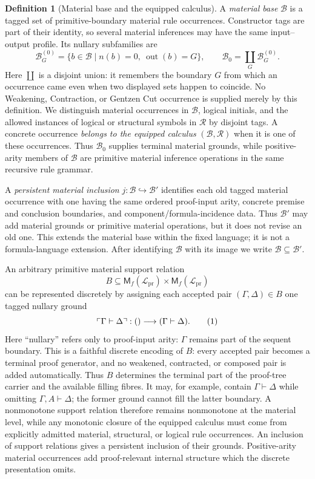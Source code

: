 \documentclass[10pt,a4paper]{article}
\theoremstyle{plain}
\theoremstyle{definition}
\newtheorem{definition}[theorem]{Definition}
\theoremstyle{remark}
\newcommand{\Base}{\mathcal B}
\newcommand{\Rules}{\mathcal R}
\newcommand{\Lang}{\mathcal L}
\newcommand{\ms}{\mathrel{\vdash}}
\newcommand{\eqtag}{\refstepcounter{equation}\tag{\theequation}}
\begin{document}
\begin{definition}[Material base and the equipped calculus]
\label{def:material-equipped}
A \emph{material base} \(\Base\) is a tagged set of primitive-boundary
material rule occurrences.  Constructor tags are part of their identity, so several
material inferences may have the same input--output profile.  Its nullary
subfamilies are
\[
 \Base^{(0)}_G
   =\{b\in\Base\mid n(b)=0,\ \operatorname{out}(b)=G\},
 \qquad
 \Base_0=\coprod_G\Base^{(0)}_G .
\]
Here \(\coprod\) is a disjoint union: it remembers the boundary \(G\) from
which an occurrence came even when two displayed sets happen to coincide.
No Weakening, Contraction, or Gentzen Cut occurrence is supplied merely by
this definition.  We distinguish material occurrences in \(\Base\),
logical initials, and the allowed instances of logical or structural
symbols in \(\Rules\) by disjoint tags.  A concrete occurrence
\emph{belongs to the equipped calculus} \((\Base,\Rules)\) when it is one
of these occurrences.  Thus
\(\Base_0\) supplies terminal material grounds, while positive-arity
members of \(\Base\) are primitive material inference operations in the
same recursive rule grammar.

A \emph{persistent material inclusion}
\(j:\Base\hookrightarrow\Base'\) identifies each old tagged material
occurrence with one having the same ordered proof-input arity, concrete
premise and conclusion boundaries, and component/formula-incidence data.
Thus \(\Base'\) may add material grounds or primitive material operations,
but it does not revise an old one.  This extends the material base within
the fixed language; it is not a formula-language extension.  After
identifying \(\Base\) with its image we write
\(\Base\subseteq\Base'\).
\end{definition}

An arbitrary primitive material support relation
\[
 B\subseteq\mathsf M_f(\Lang_{\mathrm{pr}})
          \times\mathsf M_f(\Lang_{\mathrm{pr}})
\]
can be represented discretely by assigning each accepted pair
\((\Gamma,\Delta)\in B\) one tagged nullary ground
\[
       \ulcorner\Gamma\ms\Delta\urcorner:
       ()\longrightarrow(\Gamma\ms\Delta).
\eqtag\label{eq:discrete-material-presentation}
\]
Here ``nullary'' refers only to proof-input arity: \(\Gamma\) remains part
of the sequent boundary.  This is a faithful discrete encoding of \(B\):
every accepted pair becomes a terminal proof generator, and no weakened,
contracted, or composed pair is added automatically.  Thus \(B\) determines
the terminal part of the proof-tree carrier and the available filling
fibres.  It may, for example, contain
\(\Gamma\ms\Delta\) while omitting
\(\Gamma,A\ms\Delta\); the former ground cannot fill the latter boundary.
A nonmonotone support relation therefore remains nonmonotone at the
material level, while any monotonic closure of the equipped calculus must
come from explicitly admitted material, structural, or logical rule
occurrences.  An inclusion of support relations gives a persistent
inclusion of their grounds.  Positive-arity material occurrences add
proof-relevant internal structure which the discrete presentation omits.
\end{document}
